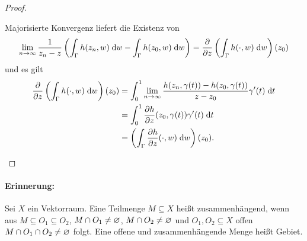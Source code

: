 \documentclass[a4paper,twoside,DIV15,BCOR12mm]{scrbook}
\begin{document}
\begin{proof}
\begin{enumerate}
Majorisierte Konvergenz liefert die Existenz von
\[\displaystyle\lim_{n\rightarrow\infty}\frac{1}{z_n-z}\left(\int_{\Gamma}^{}{h(z_n,w)}\;\mathrm{d}w-\int_{\Gamma}^{}{h(z_0,w)}\;\mathrm{d}w\right) = \frac{\partial}{\partial z}\left(\int_{\Gamma}^{}{h(\cdot,w)}\;\mathrm{d}w\right)(z_0)\]
und es gilt
\begin{align*}
\frac{\partial}{\partial z}\left(\integral{\Gamma}{}{h(\cdot,w)}{w}\right)(z_0) &=\integral{0}{1}{\limf{n}\frac{h(z_n,\gamma(t))-h(z_0,\gamma(t))}{z-z_0}\gamma^\prime(t)}{t}\\
&=\integral{0}{1}{\frac{\partial h}{\partial z}(z_0,\gamma(t))\gamma^\prime(t)}{t}\\
&=\left(\integral{\Gamma}{}{\frac{\partial h}{\partial z}(\cdot,w)}{w}\right)(z_0).\tag*{\qedhere}%
\end{align*}
\end{enumerate}\end{proof}

\paragraph{Erinnerung:} Sei $X$ ein Vektorraum. Eine Teilmenge $M\subseteq X$ heißt zusammenhängend, wenn aus $M\subseteq O_1\subseteq O_2$, $M\cap O_1\neq \varnothing$, $M\cap O_2\neq\varnothing$ und $O_1,O_2\subseteq X$ offen $M\cap O_1 \cap O_2 \neq \varnothing$ folgt. Eine offene und zusammenhängende Menge heißt Gebiet.
\end{document}
